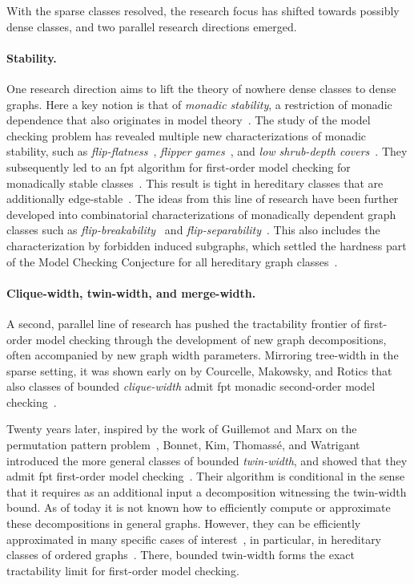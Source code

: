 \medskip
With the sparse classes resolved, the research focus has shifted towards possibly dense classes,
and two parallel research directions emerged.

\paragraph*{Stability.}
One research direction aims to lift the theory of nowhere dense classes to dense graphs.
Here a key notion is that of \emph{monadic stability}, a restriction of monadic dependence that also originates in model theory~\cite{BS1985monadic}.
The study of the model checking problem has revealed multiple new characterizations of monadic stability, such as \emph{flip-flatness}~\cite{dreier2023indiscernibles}, \emph{flipper games}~\cite{flippers}, and \emph{low shrub-depth covers}~\cite{horizons}.
They subsequently led to an fpt algorithm for first-order model checking for monadically stable classes~\cite{ms-mc1,ms-mc2}.
This result is tight in hereditary classes that are additionally edge-stable~\cite{ms-mc2,rankwidth-meets-stability}.
The ideas from this line of research have been further developed into combinatorial characterizations of monadically dependent graph classes such as \emph{flip-breakability}~\cite{flip-breakability} and \emph{flip-separability}~\cite{bonnet2025separability-icalp}.
This also includes the characterization by forbidden induced subgraphs, which settled the hardness part of the Model Checking Conjecture for all hereditary graph classes~\cite{flip-breakability}.


\paragraph*{Clique-width, twin-width, and merge-width.}
A second, parallel line of research has pushed the tractability frontier of first-order model checking through the development of new graph decompositions, often accompanied by new graph width parameters.
Mirroring tree-width in the sparse setting, it was shown early on by Courcelle, Makowsky, and Rotics that also classes of bounded \emph{clique-width} admit fpt monadic second-order model checking~\cite{courcelle2000linear}.

Twenty years later, inspired by the work of Guillemot and Marx on the permutation pattern problem~\cite{guillemot2014finding}, Bonnet, Kim, Thomass\'e, and Watrigant introduced the more general classes of bounded \emph{twin-width}, and showed that they admit fpt first-order model checking~\cite{tww1}.
Their algorithm is conditional in the sense that it requires as an additional input a decomposition witnessing the twin-width bound.
As of today it is not known how to efficiently compute or approximate these decompositions in general graphs. However, they can be efficiently approximated in many specific cases of interest~\cite{tww8}, in particular, in hereditary classes of ordered graphs~\cite{tww4}.
There, bounded twin-width forms the exact tractability limit for first-order model checking.

